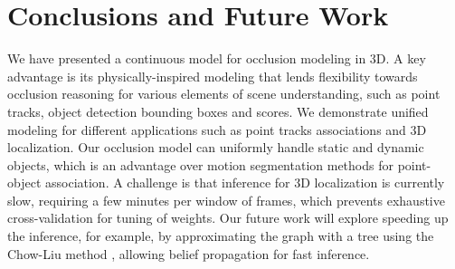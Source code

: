 \section{Conclusions and Future Work}
\label{sec:conclusions}

We have presented a continuous model for occlusion modeling in 3D. A key advantage is its physically-inspired modeling that lends flexibility towards occlusion reasoning for various elements of scene understanding, such as point tracks, object detection bounding boxes and scores. We demonstrate unified modeling for different applications such as point tracks associations and 3D localization. Our occlusion model can uniformly handle static and dynamic objects, which is an advantage over motion segmentation methods for point-object association. A challenge is that inference for 3D localization is currently slow, requiring a few minutes per window of frames, which prevents exhaustive cross-validation for tuning of weights. Our future work will explore speeding up the inference, for example, by approximating the graph with a tree using the Chow-Liu method \cite{chow1968approximating}, allowing belief propagation for fast inference.




